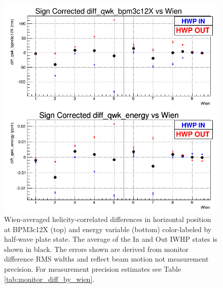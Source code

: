 \begin{figure}
\centering
\includegraphics[width=5.9in]{./Pictures/EDifferences_by_wien.png}
\caption{\label{fig:Ediff_by_wien}Wien-averaged helicity-correlated differences in horizontal position at BPM3c12X (top) and \Qs energy variable (bottom) color-labeled by half-wave plate state. The average of the In and Out IWHP states is shown in black. The errors shown are derived from monitor difference RMS widths and reflect beam motion not measurement precision. For measurement precision estimates see Table \ref{tab:monitor_diff_by_wien}.}
\end{figure}
